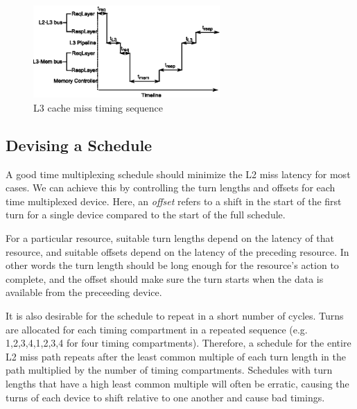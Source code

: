\begin{figure}
    \begin{center}
        \includegraphics[width=2.8in]{figs/miss_timing.eps}
        \caption{L3 cache miss timing sequence}
        \label{fig:miss_timing}
    \end{center}
\end{figure}

\subsection{Devising a Schedule}
A good time multiplexing schedule should minimize the L2 miss latency for most 
cases. We can achieve this by controlling the turn lengths and offsets for each 
time multiplexed device. Here, an \emph{offset} refers to a shift in the start 
of the first turn for a single device compared to the start of the full 
schedule.

For a particular resource, suitable turn lengths depend on the latency of that 
resource, and suitable offsets depend on the latency of the preceding resource. 
In other words the turn length should be long enough for the resource's action 
to complete, and the offset should make sure the turn starts when the data is 
available from the preceeding device.

It is also desirable for the schedule to repeat in a short number of cycles.
Turns are allocated for each timing compartment in a repeated sequence
(e.g. 1,2,3,4,1,2,3,4 for four timing compartments). Therefore, a schedule
for the entire L2 miss path repeats after the least common multiple of each turn
length in the path multiplied by the number of timing compartments. Schedules 
with turn lengths that have a high least common multiple will often be erratic, 
causing the turns of each device to shift relative to one another and cause bad 
timings.

